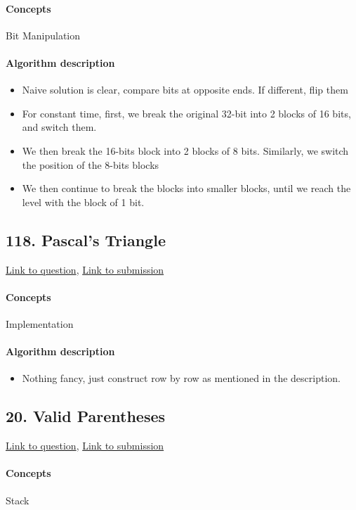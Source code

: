 \documentclass[11pt]{book}
\begin{document}
\paragraph{Concepts}
Bit Manipulation
\paragraph{Algorithm description}
\begin{itemize}
    \item Naive solution is clear, compare bits at opposite ends. If different, flip them
    \item For constant time, first, we break the original 32-bit into 2 blocks of 16 bits, and switch them. 
    \item We then break the 16-bits block into 2 blocks of 8 bits. Similarly, we switch the position of the 8-bits blocks 
    \item We then continue to break the blocks into smaller blocks, until we reach the level with the block of 1 bit. 
\end{itemize}

\subsection{118. Pascal's Triangle}
\href{https://leetcode.com/problems/pascals-triangle/}{Link to question},
\href{https://leetcode.com/submissions/detail/335834624/}{Link to submission}
\paragraph{Concepts}
Implementation
\paragraph{Algorithm description}
\begin{itemize}
    \item Nothing fancy, just construct row by row as mentioned in the description.
\end{itemize}

\subsection{20. Valid Parentheses}
\href{https://leetcode.com/problems/valid-parentheses/}{Link to question},
\href{https://leetcode.com/submissions/detail/335853123/}{Link to submission}
\paragraph{Concepts}
Stack
\end{document}
